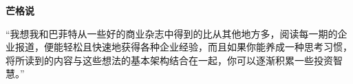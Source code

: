 \renewcommand{\bookchapter}{书单4}
\cleardoublepage
{}

\textbf{芒格说}
\par

\begin{MungerSaysBox}
{\kaishu “我想我和巴菲特从一些好的商业杂志中得到的比从其他地方多，阅读每一期的企业报道，便能轻松且快速地获得各种企业经验，而且如果你能养成一种思考习惯，将所读到的内容与这些想法的基本架构结合在一起，你可以逐渐积累一些投资智慧。”}
\par
\end{MungerSaysBox}

\cleardoublepage







